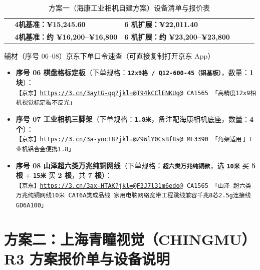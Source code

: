 \documentclass[10pt, a4paper]{ctexart}
\begin{document}
\begin{table}[H]
\begin{tabularx}{\textwidth}{@{} C{0.65cm} L{2.60cm} Y C{1.05cm} L{2.60cm} L{3.60cm} @{}}
\midrule
{}
 & \textbf{\color{AccentTeal}4机基准：¥15,245.60} & \textbf{6 机扩展：¥22,011.40} \\
 & \textbf{4机基准：约 ¥16,200--¥16,800} & \textbf{6 机扩展：约 ¥23,200--¥23,800} \\
\bottomrule
\end{tabularx}
\caption{方案一（海康工业相机自建方案）设备清单与报价表}
\label{tab:hik_bom}
\end{table}

\vspace{-6pt}
\begin{keybox}[top=4pt, bottom=4pt]{辅材（序号 06--08）京东下单口令速查（可直接复制打开京东 App）}
\scriptsize
\begin{itemize}
  \item \textbf{序号 06 棋盘格标定板}（下单规格：\textbf{\texttt{12x9格 / Q12-600-45（铝基板）}}，数量：\textbf{1 块}）：\\
  \texttt{【京东】\href{https://3.cn/3aytG-qq?jkl=@T94kCClENKUq@}{https://3.cn/3aytG-qq?jkl=@T94kCClENKUq@} CA1565 「高精度12x9相机视觉标定板不反光」}
  \item \textbf{序号 07 工业相机三脚架}（下单规格：\textbf{\texttt{1.8米}}，备注配海康相机底座，数量：\textbf{4 个}）：\\
  \texttt{【京东】\href{https://3.cn/3a-yocT8?jkl=@Z9WlY0CsBf8s@}{https://3.cn/3a-yocT8?jkl=@Z9WlY0CsBf8s@} MF3390 「角架适用于工业机铝合金便携1.8」}
  \item \textbf{序号 08 山泽超六类万兆纯铜网线}（下单规格：\textbf{\texttt{超六类万兆纯铜款}}，选 \textbf{\texttt{10米}} 买 \textbf{5 根} + \textbf{\texttt{15米}} 买 \textbf{2 根}，共 \textbf{7 根}）：\\
  \texttt{【京东】\href{https://3.cn/3ax-HTAK?jkl=@F3J7l31m6edo@}{https://3.cn/3ax-HTAK?jkl=@F3J7l31m6edo@} CA1565 「山泽 超六类万兆纯铜网线10米 CAT6A类成品线 家用电脑网络宽带工程跳线兼容千兆8芯2.5g连接线GD6A100」}
\end{itemize}
\end{keybox}

\clearpage
\section{方案二：上海青瞳视觉（CHINGMU）R3 方案报价单与设备说明}
\end{document}
